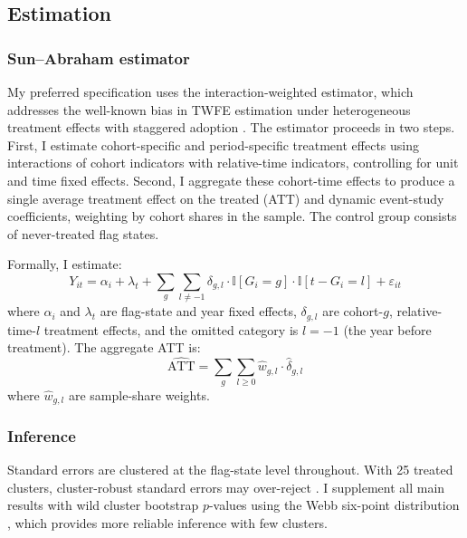 \documentclass[12pt]{article}
\newcommand{\ind}{\mathbb{I}}
\begin{document}
\subsection{Estimation}

\subsubsection*{Sun--Abraham estimator} My preferred specification uses the \citet{sun2021estimating} interaction-weighted estimator, which addresses the well-known bias in TWFE estimation under heterogeneous treatment effects with staggered adoption \citep{goodmanbacon2021difference, callaway2021difference}. The estimator proceeds in two steps. First, I estimate cohort-specific and period-specific treatment effects using interactions of cohort indicators with relative-time indicators, controlling for unit and time fixed effects. Second, I aggregate these cohort-time effects to produce a single average treatment effect on the treated (ATT) and dynamic event-study coefficients, weighting by cohort shares in the sample. The control group consists of never-treated flag states.

Formally, I estimate:
\begin{equation}
Y_{it} = \alpha_i + \lambda_t + \sum_{g} \sum_{l \neq -1} \delta_{g,l} \cdot \ind[G_i = g] \cdot \ind[t - G_i = l] + \varepsilon_{it}
\label{eq:sa}
\end{equation}
where $\alpha_i$ and $\lambda_t$ are flag-state and year fixed effects, $\delta_{g,l}$ are cohort-$g$, relative-time-$l$ treatment effects, and the omitted category is $l = -1$ (the year before treatment). The aggregate ATT is:
\begin{equation}
\widehat{\text{ATT}} = \sum_{g} \sum_{l \geq 0} \hat{w}_{g,l} \cdot \hat{\delta}_{g,l}
\end{equation}
where $\hat{w}_{g,l}$ are sample-share weights.

\subsubsection*{Inference} Standard errors are clustered at the flag-state level throughout. With 25 treated clusters, cluster-robust standard errors may over-reject \citep{cameron2008bootstrap}. I supplement all main results with wild cluster bootstrap $p$-values using the Webb six-point distribution \citep{roodman2019fast}, which provides more reliable inference with few clusters.
\end{document}
